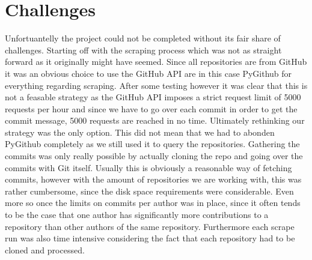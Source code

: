 \section{Challenges}
\label{sec:challenges}

Unfortuantelly the project could not be completed without its fair share of
challenges. Starting off with the scraping process which was not as straight
forward as it originally might have seemed. Since all repositories are from
GitHub it was an obvious choice to use the GitHub API are in this case PyGithub
for everything regarding scraping. After some testing however it was clear that
this is not a feasable strategy as the GitHub API imposes a strict request
limit of 5000 requests per hour and since we have to go over each commit in
order to get the commit message, 5000 requests are reached in no time.
Ultimately rethinking our strategy was the only option. This did not mean that
we had to abonden PyGithub completely as we still used it to query the
repositories. Gathering the commits was only really possible by actually
cloning the repo and going over the commits with Git itself. Usually this is
obviously a reasonable way of fetching commits, however with the amount of
repositories we are working with, this was rather cumbersome, since the disk
space requirements were considerable. Even more so once the limits on commits
per author was in place, since it often tends to be the case that one author
has significantly more contributions to a repository than other authors of the
same repository. Furthermore each scrape run was also time intensive
considering the fact that each repository had to be cloned and processed.

